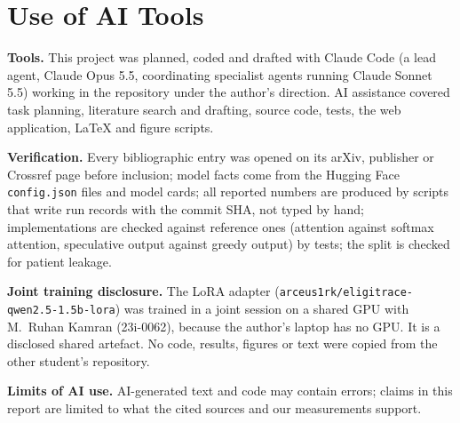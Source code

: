 \section{Use of AI Tools}
\label{app:ai}
\textbf{Tools.} This project was planned, coded and drafted with Claude Code (a lead agent, Claude Opus 5.5, coordinating specialist agents running Claude Sonnet 5.5) working in the repository under the author's direction. AI assistance covered task planning, literature search and drafting, source code, tests, the web application, LaTeX and figure scripts.

\textbf{Verification.} Every bibliographic entry was opened on its arXiv, publisher or Crossref page before inclusion; model facts come from the Hugging Face \texttt{config.json} files and model cards; all reported numbers are produced by scripts that write run records with the commit SHA, not typed by hand; implementations are checked against reference ones (attention against softmax attention, speculative output against greedy output) by tests; the split is checked for patient leakage. 

\textbf{Joint training disclosure.} The LoRA adapter (\texttt{arceus1rk/eligitrace-qwen2.5-1.5b-lora}) was trained in a joint session on a shared GPU with M.\ Ruhan Kamran (23i-0062), because the author's laptop has no GPU. It is a disclosed shared artefact. No code, results, figures or text were copied from the other student's repository.

\textbf{Limits of AI use.} AI-generated text and code may contain errors; claims in this report are limited to what the cited sources and our measurements support.
